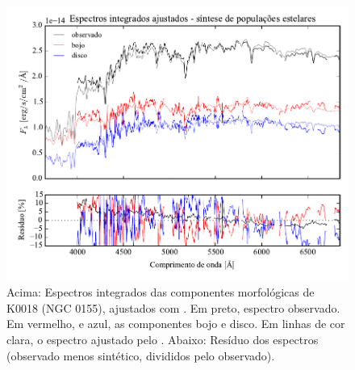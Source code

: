 \begin{figure}
	\includegraphics[page=1,width=\textwidth]{figuras/sample006a_synthesis}
	\caption[Espectros ajustados com \starlight das componentes morfológicas de
	K0018 (NGC 0155)]
	{Acima: Espectros integrados das componentes morfológicas de
	K0018 (NGC 0155), ajustados com \starlight. Em preto, espectro observado. Em
	vermelho, e azul, as componentes bojo e disco. Em linhas de cor clara, o
	espectro ajustado pelo \starlight. Abaixo: Resíduo dos espectros (observado
	menos sintético, divididos pelo observado).}
	\label{fig:decompSintese:K0018}
\end{figure}

